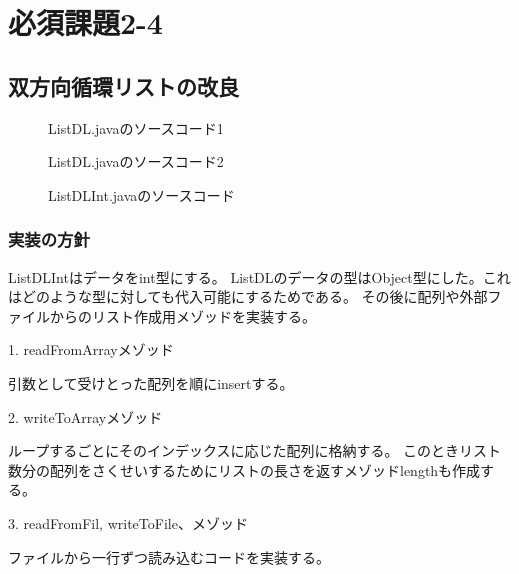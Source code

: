 \documentclass[10.5pt,a4paper]{jsarticle}
\begin{document}
\section{必須課題2-4}

\subsection{双方向循環リストの改良}

\begin{figure}[t]
  \begin{center}
   
   \caption{ListDL.javaのソースコード1}
   \label{code:ListDL}
  \end{center}
 \end{figure}

 \begin{figure}[t]
  \begin{center}
   
   \caption{ListDL.javaのソースコード2}
   \label{code:ListDL}
  \end{center}
 \end{figure}

 
\begin{figure}[t]
  \begin{center}
   
   \caption{ListDLInt.javaのソースコード}
   \label{code:ListDL}
  \end{center}
 \end{figure}

\subsubsection{実装の方針}\label{sec:bs_impl_policy}
ListDLIntはデータをint型にする。
ListDLのデータの型はObject型にした。これはどのような型に対しても代入可能にするためである。
その後に配列や外部ファイルからのリスト作成用メゾッドを実装する。

1. readFromArrayメゾッド

引数として受けとった配列を順にinsertする。

2. writeToArrayメゾッド

ループするごとにそのインデックスに応じた配列に格納する。
このときリスト数分の配列をさくせいするためにリストの長さを返すメゾッドlengthも作成する。

3. readFromFil, writeToFile、メゾッド

ファイルから一行ずつ読み込むコードを実装する。
\end{document}
